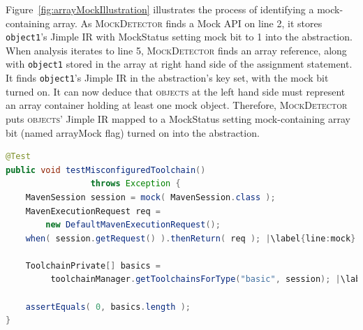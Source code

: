 Figure~\ref{fig:arrayMockIllustration} illustrates the process of identifying a mock-containing array. As \textsc{MockDetector} finds a Mock API on line 2, it stores \texttt{object1}'s Jimple IR with MockStatus setting mock bit to 1 into the abstraction. When analysis iterates to line 5, \textsc{MockDetector} finds an array reference, along with \texttt{object1} stored in the array at right hand side of the assignment statement. It finds \texttt{object1}'s Jimple IR in the abstraction's key set, with the mock bit turned on. It can now deduce that \textsc{objects} at the left hand side must represent an array container holding at least one mock object. Therefore, \textsc{MockDetector} puts \textsc{objects}' Jimple IR mapped to a MockStatus setting mock-containing array bit (named arrayMock flag) turned on into the abstraction. 


\begin{lstlisting}[basicstyle=\ttfamily, caption={This code snippet illustrates an example from maven-core, where both the focal method \texttt{getToolchainsForType} and a method invocation \texttt{getRequest} on a mock object occur in test \textit{testMisconfiguredToolchain()}},
basicstyle=\scriptsize\ttfamily,language = Java, framesep=4.5mm, escapechar=|,
framexleftmargin=1.0mm, captionpos=b, xleftmargin=3.5ex, label=lis:mockCall]
@Test
public void testMisconfiguredToolchain()
                 throws Exception {
    MavenSession session = mock( MavenSession.class );
    MavenExecutionRequest req = 
        new DefaultMavenExecutionRequest();
    when( session.getRequest() ).thenReturn( req ); |\label{line:mock}|
    
    ToolchainPrivate[] basics =
         toolchainManager.getToolchainsForType("basic", session); |\label{line:real}|
    
    assertEquals( 0, basics.length );
}
\end{lstlisting}

